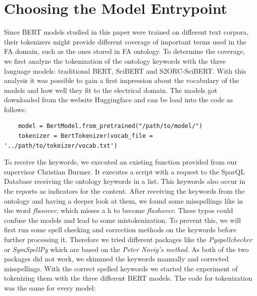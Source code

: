 \section{Choosing the Model Entrypoint}
Since BERT models studied in this paper were trained on different text corpora, their tokenizers might provide different coverage of important terms used in the FA domain, such as the ones stored in FA ontology. To determine the coverage, we first analyze the tokenization of the ontology keywords with the three language models: traditional BERT, SciBERT and S2ORC-SciBERT. With this analysis it was possible to gain a first impression about the vocabulary of the models and how well they fit to the electrical domain. \newline
The models got downloaded from the website Huggingface \cite{models} and can be load into the code as follows:

\begin{code}
	\label{code:checkpoint}
\begin{verbatim}
	model = BertModel.from_pretrained("/path/to/model/")
	tokenizer = BertTokenizer(vocab_file = '../path/to/tokeizer/vocab.txt')
\end{verbatim}
\end{code}

To receive the keywords, we executed an existing function provided from our supervisor Christian Burmer. It executes a script with a request to the SparQL Database receiving the ontology keywords in a list. This keywords also occur in the reports as indicators for the content. \newline
After receiving the keywords from the ontology and having a deeper look at them, we found some misspellings like in the word \textit{flasover}, which misses a h to become \textit{flashover}. These typos could confuse the models and lead to some mistokenization. To prevent this, we will first run some spell checking and correction methods on the keywords before further processing it. Therefore we tried different packages like the \textit{Pyspellchecker} or \textit{SymSpellPy} which are based on the \textit\alert{{Peter Novig's method}}. As both of the two packages did not work, we skimmed the keywords manually and corrected misspellings. \newline
With the correct spelled keywords we started the experiment of tokenizing them with the three different BERT models. The code for tokenization was the same for every model:

